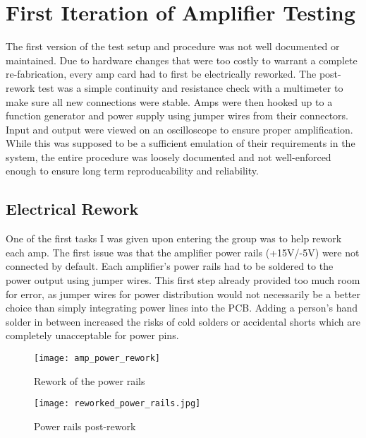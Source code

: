 %
%
\chapter{First Iteration of Amplifier Testing}
The first version of the test setup and procedure was not well documented or maintained. Due to hardware changes that were too costly to warrant a complete re-fabrication, every amp card had to first be electrically reworked. The post-rework test was a simple continuity and resistance check with a multimeter to make sure all new connections were stable. Amps were then hooked up to a function generator and power supply using jumper wires from their connectors. Input and output were viewed on an oscilloscope to ensure proper amplification. While this was supposed to be a sufficient emulation of their requirements in the system, the entire procedure was loosely documented and not well-enforced enough to ensure long term reproducability and reliability.
\section{Electrical Rework}
One of the first tasks I was given upon entering the group was to help rework each amp. The first issue was that the amplifier power rails (+15V/-5V) were not connected by default. Each amplifier's power rails had to be soldered to the power output using jumper wires. This first step already provided too much room for error, as jumper wires for power distribution would not necessarily be a better choice than simply integrating power lines into the PCB. Adding a person's hand solder in between increased the risks of cold solders or accidental shorts which are completely unacceptable for power pins. \par 
\begin{figure}[!htb]
	\texttt{[image: amp\_power\_rework]}
	\centering
	\caption{Rework of the power rails}
	\centering
	\texttt{[image: reworked\_power\_rails.jpg]}
	\centering
	\caption{Power rails post-rework}
\end{figure}
